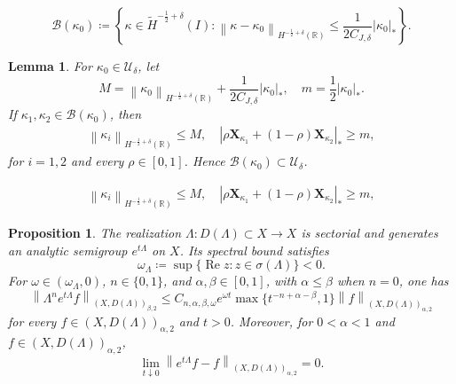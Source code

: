 \documentclass[10pt,a4paper]{amsart}
\newtheorem{lemma}{Lemma}
\newtheorem{proposition}{Proposition}
\newcommand{\R}{\mathbb{R}}
\newcommand{\abs}[1]{\left\lvert #1 \right\rvert}
\newcommand{\bm}[1]{\boldsymbol{#1}}
\newcommand{\hr}[1]{H^{#1}(\R)}
\newcommand{\mc}[1]{\mathcal{#1}}
\newcommand{\norm}[1]{\left\lVert #1 \right\rVert}
\newcommand{\paren}[1]{\left(#1\right)}
\newcommand{\thi}[1]{\wt H^{#1}(I)}
\newcommand{\wt}[1]{\widetilde{#1}}
\newcommand{\xka}[1]{\bm X_{\kappa_{#1}}}
\begin{document}
\begin{equation}\label{eqn:Bkappa0}
\mc B(\kappa_0) \coloneqq \left\{\kappa\in \thi{-\frac{1}{2}+\delta}: \norm{\kappa-\kappa_0}_{\hr{-\frac{1}{2}+\delta}}\le \frac{1}{2C_{J,\delta}}\abs{\kappa_0}_* \right\}.
\end{equation}

\begin{lemma}\label{lem:set-ok0}
For $\kappa_0\in \mc U_\delta$, let
\begin{equation}
    M
    = \norm{\kappa_0}_{\hr{-\frac{1}{2}+\delta}}
    +\frac{1}{2C_{J,\delta}}\abs{\kappa_0}_*,
    \quad
    m = \frac{1}{2}\abs{\kappa_0}_*.
\end{equation}
If $\kappa_1,\kappa_2 \in \mc B(\kappa_0)$, then
\begin{align}\label{eqn:neighborhood-geometry}
    \norm{\kappa_i}_{\hr{-\frac{1}{2}+\delta}} \le M,
    \quad
    \abs{\rho\xka{1} + \paren{1-\rho}\xka{2}}_* \ge m,
\end{align}
for $i=1,2$ and every $\rho\in[0,1]$.
Hence $\mc B(\kappa_0)\subset\mc U_\delta$.
\end{lemma}

\begin{align}
    \norm{\kappa_i}_{\hr{-\frac{1}{2}+\delta}} \le M,
    \quad
    \abs{\rho\xka{1} + \paren{1-\rho}\xka{2}}_* \ge m,
\end{align}

\begin{proposition}\label{prop:lambda-semigroup}
The realization $\Lambda:D(\Lambda)\subset X\to X$ is sectorial and
generates an analytic semigroup $e^{t\Lambda}$ on $X$. Its spectral bound
satisfies
\begin{equation}
    \omega_\Lambda
    \coloneqq\sup\{\operatorname{Re}z:z\in\sigma(\Lambda)\}<0.
\end{equation}
For $\omega\in(\omega_\Lambda,0)$, $n\in\{0,1\}$, and
$\alpha,\beta\in[0,1]$, with $\alpha\le\beta$ when $n=0$, one has
\begin{equation}\label{eqn:lambda-semigroup-est}
    \norm{\Lambda^n e^{t\Lambda}f}_{(X,D(\Lambda))_{\beta,2}}
    \le C_{n,\alpha,\beta,\omega}e^{\omega t}
    \max\{t^{-n+\alpha-\beta},1\}
    \norm{f}_{(X,D(\Lambda))_{\alpha,2}}
\end{equation}
for every $f\in(X,D(\Lambda))_{\alpha,2}$ and $t>0$.
Moreover, for $0<\alpha<1$ and
$f\in(X,D(\Lambda))_{\alpha,2}$,
\begin{equation}\label{eqn:lambda-semigroup-cont}
    \lim_{t\downarrow0}
    \norm{e^{t\Lambda}f-f}_{(X,D(\Lambda))_{\alpha,2}}=0.
\end{equation}
\end{proposition}
\end{document}
